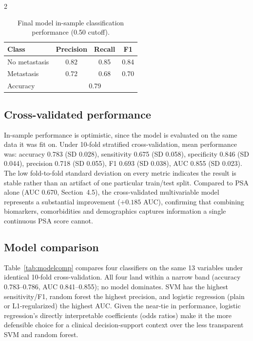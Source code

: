 ﻿\documentclass[a4paper,10pt]{article}
\begin{document}
\begin{multicols*}{2}
\begin{table}[H]
\centering
\caption{Final model in-sample classification performance (0.50 cutoff).}
\label{tab:final_perf}
\begin{tabular}{lccc}
\toprule
Class & Precision & Recall & F1 \\
\midrule
No metastasis & 0.82 & 0.85 & 0.84 \\
Metastasis & 0.72 & 0.68 & 0.70 \\
\midrule
Accuracy & \multicolumn{3}{c}{0.79} \\
\bottomrule
\end{tabular}
\end{table}

\subsection{Cross-validated performance}
In-sample performance is optimistic, since the model is evaluated on the same data it was fit on. Under 10-fold stratified cross-validation, mean performance was: accuracy 0.783 (SD 0.028), sensitivity 0.675 (SD 0.058), specificity 0.846 (SD 0.044), precision 0.718 (SD 0.055), F1 0.693 (SD 0.038), AUC 0.855 (SD 0.023). The low fold-to-fold standard deviation on every metric indicates the result is stable rather than an artifact of one particular train/test split. Compared to PSA alone (AUC 0.670, Section~4.5), the cross-validated multivariable model represents a substantial improvement ($+0.185$ AUC), confirming that combining biomarkers, comorbidities and demographics captures information a single continuous PSA score cannot.

\subsection{Model comparison}
Table~\ref{tab:modelcomp} compares four classifiers on the same 13 variables under identical 10-fold cross-validation. All four land within a narrow band (accuracy 0.783--0.786, AUC 0.841--0.855); no model dominates. SVM has the highest sensitivity/F1, random forest the highest precision, and logistic regression (plain or L1-regularized) the highest AUC. Given the near-tie in performance, logistic regression's directly interpretable coefficients (odds ratios) make it the more defensible choice for a clinical decision-support context over the less transparent SVM and random forest.


\end{multicols*}
\end{document}
